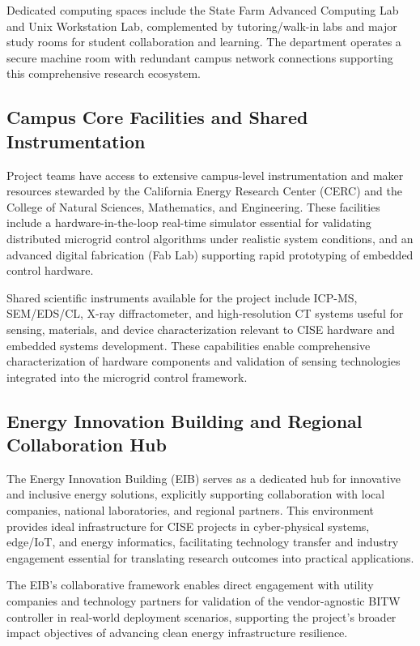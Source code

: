 \documentclass[12pt]{article}
\begin{document}
Dedicated computing spaces include the State Farm Advanced Computing Lab and Unix Workstation Lab, complemented by tutoring/walk-in labs and major study rooms for student collaboration and learning. The department operates a secure machine room with redundant campus network connections supporting this comprehensive research ecosystem.

\subsection{Campus Core Facilities and Shared Instrumentation}

Project teams have access to extensive campus-level instrumentation and maker resources stewarded by the California Energy Research Center (CERC) and the College of Natural Sciences, Mathematics, and Engineering. These facilities include a hardware-in-the-loop real-time simulator essential for validating distributed microgrid control algorithms under realistic system conditions, and an advanced digital fabrication (Fab Lab) supporting rapid prototyping of embedded control hardware.

Shared scientific instruments available for the project include ICP-MS, SEM/EDS/CL, X-ray diffractometer, and high-resolution CT systems useful for sensing, materials, and device characterization relevant to CISE hardware and embedded systems development. These capabilities enable comprehensive characterization of hardware components and validation of sensing technologies integrated into the microgrid control framework.

\subsection{Energy Innovation Building and Regional Collaboration Hub}

The Energy Innovation Building (EIB) serves as a dedicated hub for innovative and inclusive energy solutions, explicitly supporting collaboration with local companies, national laboratories, and regional partners. This environment provides ideal infrastructure for CISE projects in cyber-physical systems, edge/IoT, and energy informatics, facilitating technology transfer and industry engagement essential for translating research outcomes into practical applications.

The EIB's collaborative framework enables direct engagement with utility companies and technology partners for validation of the vendor-agnostic BITW controller in real-world deployment scenarios, supporting the project's broader impact objectives of advancing clean energy infrastructure resilience.
\end{document}
